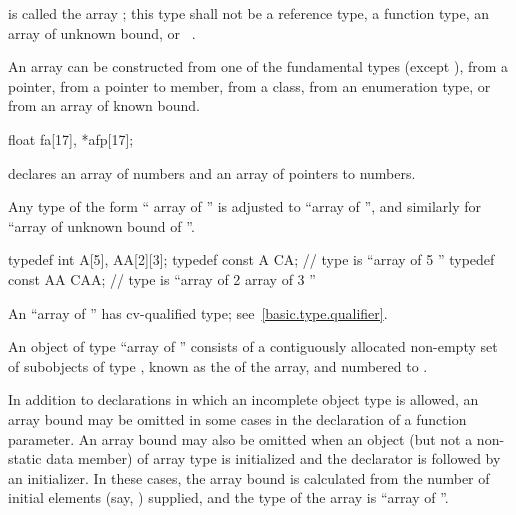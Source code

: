 \pnum
{} is called the array ;
this type shall not be
a reference type,
a function type,
an array of unknown bound, or
\cv{}~.
\begin{note}
An array can be constructed
from one of the fundamental types (except ),
from a pointer,
from a pointer to member,
from a class,
from an enumeration type,
or from an array of known bound.
\end{note}
\begin{example}
\begin{codeblock}
float fa[17], *afp[17];
\end{codeblock}
declares an array of  numbers and
an array of pointers to  numbers.
\end{example}

\pnum
Any type of the form
`` array of  ''
is adjusted to
``array of   '',
and similarly for ``array of unknown bound of ''.
\begin{example}
\begin{codeblock}
typedef int A[5], AA[2][3];
typedef const A CA;             // type is ``array of 5 ''
typedef const AA CAA;           // type is ``array of 2 array of 3 ''
\end{codeblock}
\end{example}
\begin{note}
An ``array of   ''
has cv-qualified type; see~\ref{basic.type.qualifier}.
\end{note}

\pnum
An object of type ``array of  '' consists of
a contiguously allocated non-empty set
of  subobjects of type ,
known as the  of the array,
and numbered  to .

\pnum
In addition to declarations in which an incomplete object type is allowed,
an array bound may be omitted in some cases in the declaration of a function
parameter.
An array bound may also be omitted
when an object (but not a non-static data member) of array type is initialized
and the declarator is followed by
an initializer.
%
In these cases, the array bound is calculated
from the number of initial elements (say, )
supplied,
and the type of the array is ``array of  ''.

